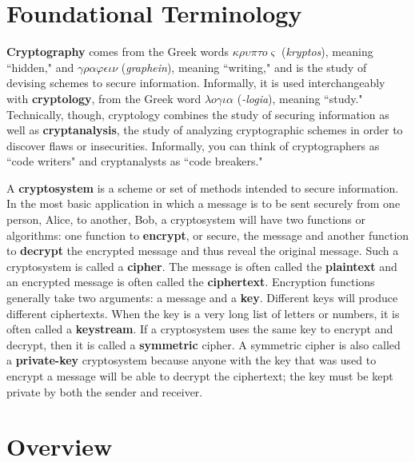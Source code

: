 		\section{Foundational Terminology}

	{\bf Cryptography}  comes from the Greek words $\kappa\rho\upsilon\pi\tau o\varsigma$ ({\em kryptos}), meaning ``hidden," and $\gamma\rho\alpha\varphi\epsilon\iota\nu$ ({\em graphein}), meaning ``writing," and is the study of devising schemes to secure information. Informally, it is used interchangeably with {\bf cryptology},  from the Greek word $\lambda o\gamma\iota\alpha$ ({\em -logia}), meaning ``study." Technically, though, cryptology combines the study of securing information as well as {\bf cryptanalysis},  the study of analyzing cryptographic schemes in order to discover flaws or insecurities. Informally, you can think of cryptographers as ``code writers" and cryptanalysts as ``code breakers."

	A {\bf cryptosystem}  is a scheme or set of methods intended to secure information. In the most basic application in which a message is to be sent securely from one person, Alice, to another, Bob, a cryptosystem will have two functions or algorithms: one function to {\bf encrypt}, or secure, the message and another function to {\bf decrypt} the encrypted message and thus reveal the original message. Such a cryptosystem is called a {\bf cipher}.  The message is often called the {\bf plaintext}  and an encrypted message is often called the {\bf ciphertext}.  Encryption functions generally take two arguments: a message and a {\bf key}.  Different keys will produce different ciphertexts. When the key is a very long list of letters or numbers, it is often called a {\bf keystream}.  If a cryptosystem uses the same key to encrypt and decrypt, then it is called a {\bf symmetric} cipher.  A symmetric cipher is also called a {\bf private-key} cryptosystem because anyone with the key that was used to encrypt a message will be able to decrypt the ciphertext; the key must be kept private by both the sender and receiver.

	\section{Overview}

